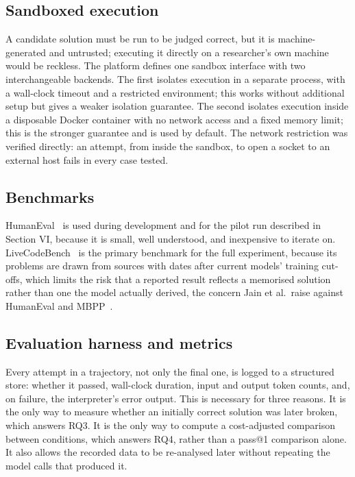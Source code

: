 \documentclass[conference]{IEEEtran}
\begin{document}
\subsection{Sandboxed execution}

A candidate solution must be run to be judged correct, but it is machine-generated and untrusted; executing it directly on a researcher's own machine would be reckless. The platform defines one sandbox interface with two interchangeable backends. The first isolates execution in a separate process, with a wall-clock timeout and a restricted environment; this works without additional setup but gives a weaker isolation guarantee. The second isolates execution inside a disposable Docker container with no network access and a fixed memory limit; this is the stronger guarantee and is used by default. The network restriction was verified directly: an attempt, from inside the sandbox, to open a socket to an external host fails in every case tested.

\subsection{Benchmarks}

HumanEval~\cite{chen2021} is used during development and for the pilot run described in Section VI, because it is small, well understood, and inexpensive to iterate on. LiveCodeBench~\cite{jain2025} is the primary benchmark for the full experiment, because its problems are drawn from sources with dates after current models' training cut-offs, which limits the risk that a reported result reflects a memorised solution rather than one the model actually derived, the concern Jain et al.\ raise against HumanEval and MBPP~\cite{jain2025}.

\subsection{Evaluation harness and metrics}

Every attempt in a trajectory, not only the final one, is logged to a structured store: whether it passed, wall-clock duration, input and output token counts, and, on failure, the interpreter's error output. This is necessary for three reasons. It is the only way to measure whether an initially correct solution was later broken, which answers RQ3. It is the only way to compute a cost-adjusted comparison between conditions, which answers RQ4, rather than a pass@1 comparison alone. It also allows the recorded data to be re-analysed later without repeating the model calls that produced it.
\end{document}
